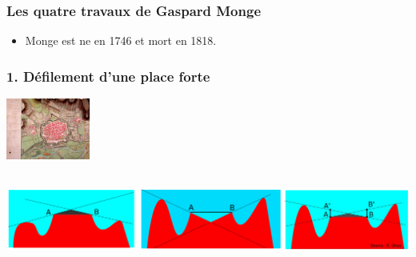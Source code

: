 \documentclass[9pt]{beamer}
\begin{document}
\begin{frame}
\frametitle{\bf Les quatre travaux de Gaspard Monge}

\begin{itemize}
  \item Monge est ne en 1746 et mort en 1818. 
\end{itemize}
 
\end{frame}

\begin{frame}
\frametitle{\bf 1. D\'efilement d'une place forte}
 
\centering \includegraphics[height=2.0cm]{defil1}

\centering \includegraphics[height=3.0cm]{defil2}

\end{frame}
\end{document}
